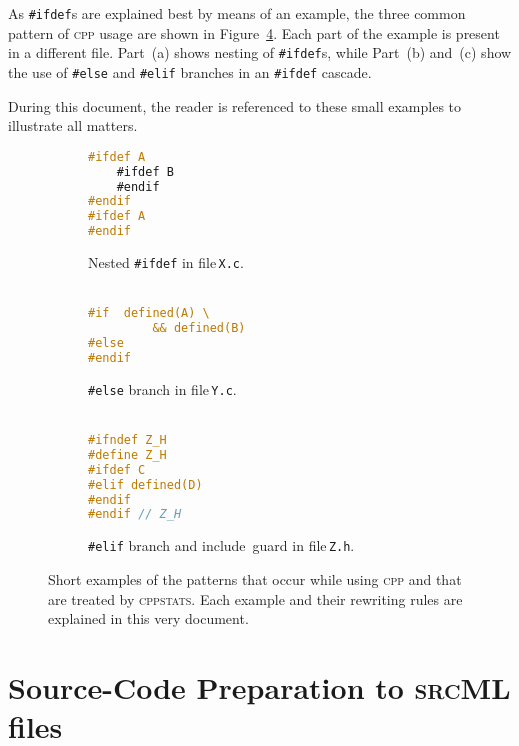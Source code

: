\documentclass[a4paper]{scrartcl}
\newcommand\code[1]{\texttt{#1}}
\newcommand\tool[1]{\textsc{#1}}
\newcommand\ifdeff[1]{\code{\##1}\xspace}
\newcommand\ifdef[0]{{\upshape\ifdeff{ifdef}}\xspace}
\newcommand\ifdefs[0]{\ifdef{}s\xspace}
\newcommand\cppstats[0]{\tool{cppstats}\xspace}
\newcommand\cpp{\tool{cpp}\xspace}
\begin{document}
As \ifdefs are explained best by means of an example, the three common pattern of \cpp usage are shown in Figure~\ref{fig:examples}.
Each part of the example is present in a different file.
Part~(a) shows nesting of \ifdefs, while Part~(b) and~(c) show the use of \ifdeff{else} and \ifdeff{elif} branches in an \ifdef cascade.

During this document, the reader is referenced to these small examples to illustrate all matters.

\begin{figure}[ht]
        \centering
        \begin{subfigure}[b]{0.3\textwidth}
					\begin{lstlisting}[language=C]
#ifdef A
	#ifdef B
	#endif
#endif
#ifdef A
#endif
					\end{lstlisting}
					\caption{Nested \ifdef in file\,\code{X.c}.\\\,}
					\label{fig:examples:a}
        \end{subfigure}
        \hfill
        \begin{subfigure}[b]{0.3\textwidth}
					\begin{lstlisting}[language=C, firstnumber=5]
#if  defined(A) \
		 && defined(B)
#else 
#endif
					\end{lstlisting}
					\caption{\ifdeff{else} branch in file\,\code{Y.c}.\\\,}
					\label{fig:examples:b}
        \end{subfigure}
				\hfill
        \begin{subfigure}[b]{0.3\textwidth}
					\begin{lstlisting}[language=C, firstnumber=8]
#ifndef Z_H
#define Z_H
#ifdef C
#elif defined(D)
#endif
#endif // Z_H
					\end{lstlisting}
					\caption{\ifdeff{elif} branch and include~guard in file\,\code{Z.h}.}
					\label{fig:examples:c}
        \end{subfigure}     
        
        \caption{Short examples of the patterns that occur while using \cpp and that are treated by \cppstats. 
        	Each example and their rewriting rules are explained in this very document.}
        \label{fig:examples}
\end{figure}



\section{Source-Code Preparation to \tool{srcML} files}
\label{sec:preparation}
\end{document}
